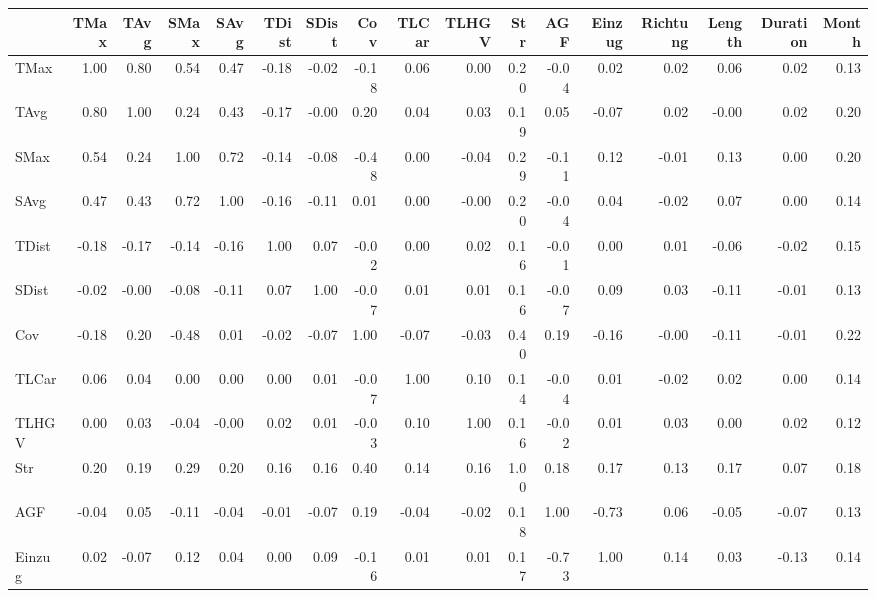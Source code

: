 \begin{tabular}{lrrrrrrrrrrrrrrrr}
\toprule
{} &  TMax &  TAvg &  SMax &  SAvg &  TDist &  SDist &   Cov &  TLCar &  TLHGV &  Str &   AGF &  Einzug &  Richtung &  Length &  Duration &  Month \\
\midrule
TMax     &  1.00 &  0.80 &  0.54 &  0.47 &  -0.18 &  -0.02 & -0.18 &   0.06 &   0.00 & 0.20 & -0.04 &    0.02 &      0.02 &    0.06 &      0.02 &   0.13 \\
TAvg     &  0.80 &  1.00 &  0.24 &  0.43 &  -0.17 &  -0.00 &  0.20 &   0.04 &   0.03 & 0.19 &  0.05 &   -0.07 &      0.02 &   -0.00 &      0.02 &   0.20 \\
SMax     &  0.54 &  0.24 &  1.00 &  0.72 &  -0.14 &  -0.08 & -0.48 &   0.00 &  -0.04 & 0.29 & -0.11 &    0.12 &     -0.01 &    0.13 &      0.00 &   0.20 \\
SAvg     &  0.47 &  0.43 &  0.72 &  1.00 &  -0.16 &  -0.11 &  0.01 &   0.00 &  -0.00 & 0.20 & -0.04 &    0.04 &     -0.02 &    0.07 &      0.00 &   0.14 \\
TDist    & -0.18 & -0.17 & -0.14 & -0.16 &   1.00 &   0.07 & -0.02 &   0.00 &   0.02 & 0.16 & -0.01 &    0.00 &      0.01 &   -0.06 &     -0.02 &   0.15 \\
SDist    & -0.02 & -0.00 & -0.08 & -0.11 &   0.07 &   1.00 & -0.07 &   0.01 &   0.01 & 0.16 & -0.07 &    0.09 &      0.03 &   -0.11 &     -0.01 &   0.13 \\
Cov      & -0.18 &  0.20 & -0.48 &  0.01 &  -0.02 &  -0.07 &  1.00 &  -0.07 &  -0.03 & 0.40 &  0.19 &   -0.16 &     -0.00 &   -0.11 &     -0.01 &   0.22 \\
TLCar    &  0.06 &  0.04 &  0.00 &  0.00 &   0.00 &   0.01 & -0.07 &   1.00 &   0.10 & 0.14 & -0.04 &    0.01 &     -0.02 &    0.02 &      0.00 &   0.14 \\
TLHGV    &  0.00 &  0.03 & -0.04 & -0.00 &   0.02 &   0.01 & -0.03 &   0.10 &   1.00 & 0.16 & -0.02 &    0.01 &      0.03 &    0.00 &      0.02 &   0.12 \\
Str      &  0.20 &  0.19 &  0.29 &  0.20 &   0.16 &   0.16 &  0.40 &   0.14 &   0.16 & 1.00 &  0.18 &    0.17 &      0.13 &    0.17 &      0.07 &   0.18 \\
AGF      & -0.04 &  0.05 & -0.11 & -0.04 &  -0.01 &  -0.07 &  0.19 &  -0.04 &  -0.02 & 0.18 &  1.00 &   -0.73 &      0.06 &   -0.05 &     -0.07 &   0.13 \\
Einzug   &  0.02 & -0.07 &  0.12 &  0.04 &   0.00 &   0.09 & -0.16 &   0.01 &   0.01 & 0.17 & -0.73 &    1.00 &      0.14 &    0.03 &     -0.13 &   0.14 \\

\end{tabular}
